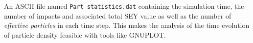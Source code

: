 An ASCII file named {\tt Part\_statistics.dat} containing the simulation time, the number of impacts and associated total SEY value as well as the number of {\em effective particles} in each time step. This makes the analysis of the time evolution of particle density feasible with  tools like GNUPLOT. 

 
